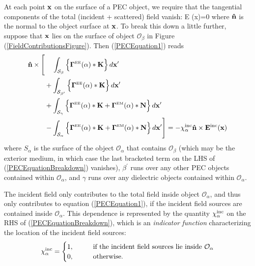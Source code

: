 \documentclass[dvips,letterpaper]{article}
\newcommand{\BG}{\boldsymbol{\Gamma}}
\begin{document}
At each point $\mathbf{x}$ on the surface of a PEC object,
we require that the tangential components of the 
total (incident + scattered) field vanish:
{ \times \vb E (\vb x)=0 
}
where $\mathbf{\hat n}$ is the normal to the object surface
at $\mathbf{x}$. 
To break this down a little further, suppose that $\mathbf{x}$
lies on the surface of object $\mathcal{O}_\beta$ in
Figure (\ref{FieldContributionsFigure}). Then (\ref{PECEquation1}) 
reads
\begin{align}
\vbhat{n}\times
 \Bigg[  &\hphantom{+}\,\,\int_{\mathcal{S_\beta}} 
           \Big\{ \BG\supt{EE}(\alpha)*\vb K \Big\} \, d\vb x^\prime
\nn
         &+\int_{\mathcal{S_{\beta^\prime}}} 
           \Big\{ \BG\supt{EE}(\alpha)*\vb K \Big\} \, d\vb x^\prime
\nn
         &+\int_{\mathcal{S_\gamma}} 
           \Big\{ \BG\supt{EE}(\alpha)*\vb K 
                 +\BG\supt{EM}(\alpha)*\vb N \Big\} \, d\vb x^\prime
\nn
         &-\int_{\mathcal{S_\alpha}} 
           \Big\{ \BG\supt{EE}(\alpha)*\vb K 
                 +\BG\supt{EM}(\alpha)*\vb N \Big\} \, d\vb x^\prime
 \Bigg]
= -\chi\sups{inc}_\alpha \vbhat{n}\times \vb E\sups{inc}(\vb x)
\label{PECEquationBreakdown}
\end{align}
where $S_\alpha$ is the surface of the object $\mathcal{O}_\alpha$ 
that contains $\mathcal{O}_\beta$ (which may be the exterior medium, 
in which case the last bracketed term on the LHS 
of (\ref{PECEquationBreakdown}) vanishes),
$\beta^\prime$ runs over any other PEC objects contained
within $\mathcal{O}_\alpha$, and $\gamma$ runs over
any dielectric objects contained within 
$\mathcal{O}_\alpha$.

The incident field only contributes to the total field
inside object $\mathcal{O}_\alpha$, 
and thus only contributes to equation (\ref{PECEquation1}),
if the incident field sources are contained inside 
$\mathcal{O}_\alpha$. This dependence is represented by the 
quantity $\chi^{\hbox{\scriptsize{inc}}}_\alpha$ on the RHS of 
(\ref{PECEquationBreakdown}), which is an 
\textit{indicator function} characterizing the location of 
the incident field sources:
$$
 \chi^{\hbox{\scriptsize{inc}}}_\alpha
 =\begin{cases} 
    1, \qquad &\text{if the incident field sources lie inside 
                      $\mathcal{O}_\alpha$} \\
    0, \qquad &\text{otherwise.}
  \end{cases} 
$$
\end{document}
